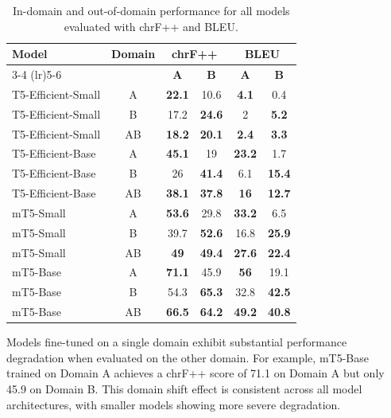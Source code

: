 \documentclass[pdflatex,sn-mathphys-num]{sn-jnl}%
\theoremstyle{thmstyleone}%
\theoremstyle{thmstyletwo}%
\theoremstyle{thmstylethree}%
\begin{document}
\begin{table}[htbp]
	\centering
	\renewcommand{\arraystretch}{1.3}
	\begin{tabular}{lccccc}
		\hline
		\multirow{2}{*}{\textbf{Model}} & \multirow{2}{*}{\textbf{Domain}} & \multicolumn{2}{c}{\textbf{chrF++}} & \multicolumn{2}{c}{\textbf{BLEU}} \\
		\cmidrule(lr){3-4} \cmidrule(lr){5-6}
		&  & \textbf{A} & \textbf{B} & \textbf{A} & \textbf{B} \\
		\hline
		T5-Efficient-Small & A & \textbf{22.1} & 10.6 & \textbf{4.1} & 0.4 \\
		T5-Efficient-Small & B & 17.2 & \textbf{24.6} & 2 & \textbf{5.2} \\
		T5-Efficient-Small & AB & \textbf{18.2} & \textbf{20.1} & \textbf{2.4} & \textbf{3.3} \\
		\hline
		T5-Efficient-Base & A & \textbf{45.1} & 19 & \textbf{23.2} & 1.7 \\
		T5-Efficient-Base & B & 26 & \textbf{41.4} & 6.1 & \textbf{15.4} \\
		T5-Efficient-Base & AB & \textbf{38.1} & \textbf{37.8} & \textbf{16} & \textbf{12.7} \\
		\hline
		mT5-Small & A & \textbf{53.6} & 29.8 & \textbf{33.2} & 6.5 \\
		mT5-Small & B & 39.7 & \textbf{52.6} & 16.8 & \textbf{25.9} \\
		mT5-Small & AB & \textbf{49} & \textbf{49.4} & \textbf{27.6} & \textbf{22.4} \\
		\hline
		mT5-Base & A & \textbf{71.1} & 45.9 & \textbf{56} & 19.1 \\
		mT5-Base & B & 54.3 & \textbf{65.3} & 32.8 & \textbf{42.5} \\
		mT5-Base & AB & \textbf{66.5} & \textbf{64.2} & \textbf{49.2} & \textbf{40.8} \\
		\hline
	\end{tabular}
	\vspace{4pt}
	\caption{In-domain and out-of-domain performance for all models evaluated with chrF++ and BLEU.}
	\label{tab:main_results}
\end{table}

Models fine-tuned on a single domain exhibit substantial performance degradation when evaluated on the other domain. For example, mT5-Base trained on Domain A achieves a chrF++ score of 71.1 on Domain A but only 45.9 on Domain B. This domain shift effect is consistent across all model architectures, with smaller models showing more severe degradation.
\end{document}

